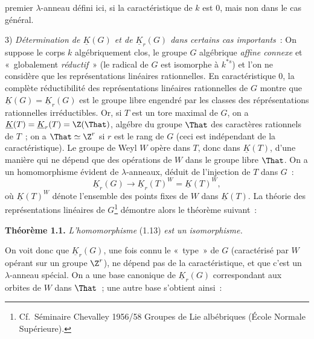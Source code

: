 premier $\lambda$-anneau défini ici, si la caractéristique de $k$ est $0$, mais non dans le cas général.

3) \emph{Détermination de $\underline{K}(G)$ et de $\underline{K}_r(G)$ dans certains cas importants}~: On suppose le corps $k$ algébriquement clos, le groupe $G$ algébrique \emph{affine connexe} et «~globalement \emph{réductif}~» (le radical de $G$ est isomorphe à $k^{*s}$) et l'on ne considère que les représentations linéaires rationnelles. En caractéristique $0$, la complète réductibilité des représentations linéaires rationnelles de $G$ montre que $\underline{K}(G)=\underline{K}_r(G)$ est le groupe libre engendré par les classes des réprésentations rationnelles irréductibles. Or, si $T$ est un tore maximal de $G$, on a $\underline{K}(T)=\underline{K}_r(T)=\Z(\That)$, algébre du groupe $\That$ des caractères rationnels de $T$~; on a $\That\simeq\Z^r$ si $r$ est le rang de $G$ (ceci est indépendant de la caractéristique). Le groupe de Weyl $W$ opère dans $T$, donc dans $\underline{K}(T)$, d'une manière qui ne dépend que des opérations de $W$ dans le groupe libre $\That$. On a un homomorphisme évident de $\lambda$-anneaux, déduit de l'injection de $T$ dans $G$~:
\begin{equation}\tag{1.13}
\underline{K}_r(G)\longrightarrow \underline{K}_r(T)^W=\underline{K}(T)^W,
\end{equation}
où $\underline{K}(T)^W$ dénote l'ensemble des points fixes de $W$ dans $\underline{K}(T)$. La théorie des représentations linéaires de $G$\footnote{Cf.\ Séminaire Chevalley 1956/58 Groupes de Lie albébriques (École Normale Supérieure).} démontre alors le théorème suivant~:

\textbf{Théorème 1.1.} \emph{L'homomorphisme} (1.13) \emph{est un isomorphisme.}

On voit donc que $\underline{K}_r(G)$, une fois connu le «~type~» de $G$ (caractérisé par $W$ opérant sur un groupe $\Z^r$), ne dépend pas de la caractéristique, et que c'est un $\lambda$-anneau spécial. On a une base canonique de $\underline{K}_r(G)$ correspondant aux orbites de $W$ dans $\That$~; une autre base s'obtient ainsi~:
